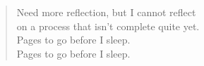 \begin{draftvspace}{20in}
  \begin{verse}
    Need more reflection, but I cannot reflect \\
    on a process that isn't complete quite yet. \\
    Pages to go before I sleep. \\
    Pages to go before I sleep. \\
  \end{verse}
\end{draftvspace}

